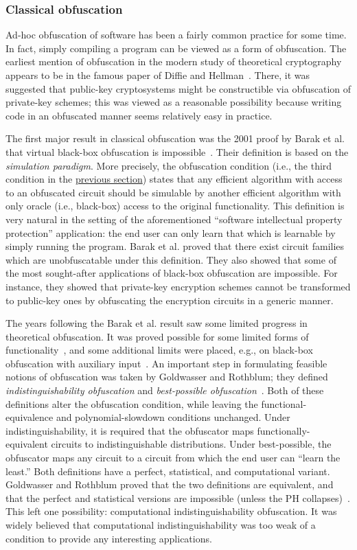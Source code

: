\documentclass[envcountsame]{llncs}
\numberwithin{equation}{section}
\newcommand{\expreft}[2]{\texorpdfstring{\hyperref[#2]{#1}}{#1}}
\begin{document}
\subsubsection{Classical obfuscation} 

Ad-hoc obfuscation of software has been a fairly common practice for some time. In fact, simply compiling a program can be viewed as a form of obfuscation.  The earliest mention of obfuscation in the modern study of theoretical cryptography appears to be in the famous paper of Diffie and Hellman~\cite{DH76}. There, it was suggested that public-key cryptosystems might be constructible via obfuscation of private-key schemes; this was viewed as a reasonable possibility because writing code in an obfuscated manner seems relatively easy in practice. 

The first major result in classical obfuscation was the 2001 proof by Barak et al. that virtual black-box obfuscation is impossible~\cite{BGIRSVY01, BGIRSVY12}. Their definition is based on the \emph{simulation paradigm}. More precisely, the obfuscation condition (i.e., the third condition in the \expreft{previous section}{def:obf-informal}) states that any efficient algorithm with access to an obfuscated circuit should be simulable by another efficient algorithm with only oracle (i.e., black-box) access to the original functionality. This definition is very natural in the setting of the aforementioned ``software intellectual property protection'' application: the end user can only learn that which is learnable by simply running the program. Barak et al. proved that  there exist circuit families which are unobfuscatable under this definition. They also showed that some of the most sought-after applications of black-box obfuscation are impossible. For instance, they showed that private-key encryption schemes cannot be transformed to public-key ones by obfuscating the encryption circuits in a generic manner.

The years following the Barak et al. result saw some limited progress in theoretical obfuscation. It was proved possible for some limited forms of functionality~\cite{CD08, Wee05}, and some additional limits were placed, e.g., on black-box obfuscation with auxiliary input~\cite{GK05}. An important step in formulating feasible notions of obfuscation was taken by Goldwasser and Rothblum; they defined \emph{indistinguishability obfuscation} and \emph{best-possible obfuscation}~\cite{GR07}. Both of these definitions alter the obfuscation condition, while leaving the functional-equivalence and polynomial-slowdown conditions unchanged. Under indistinguishability, it is required that the obfuscator maps functionally-equivalent circuits to indistinguishable distributions. Under best-possible, the obfuscator maps any circuit to a circuit from which the end user can ``learn the least.'' Both definitions have a perfect, statistical, and computational variant. Goldwasser and Rothblum proved that the two definitions are equivalent, and that the perfect and statistical versions are impossible (unless the PH collapses)~\cite{GR07}. This left one possibility: computational indistinguishability obfuscation. It was widely believed that computational indistinguishability was too weak of a condition to provide any interesting applications.
\end{document}

